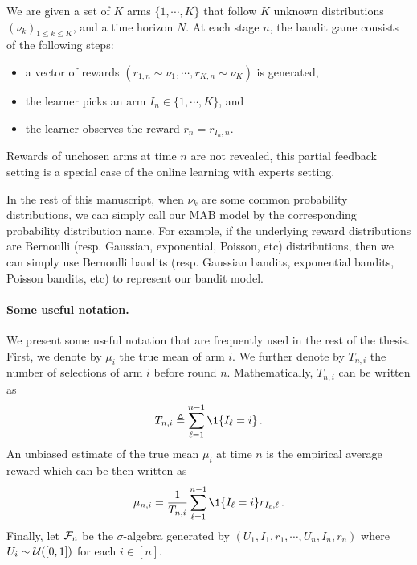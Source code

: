 \begin{definition}\label{def:mab.mab}
\begin{leftbar}[defnbar]
	We are given a set of $K$ arms $\{1,\cdots,K\}$ that follow $K$ unknown distributions $(\nu_k)_{1 \leq k \leq K}$, and a time horizon $N$. At each stage $n$, the bandit game consists of the following steps:
	\begin{itemize}
		\item a vector of rewards $(r_{1,n} \sim \nu_1, \cdots, r_{K,n} \sim \nu_K)$ is generated,
		\item the learner picks an arm $I_n \in \{1,\cdots,K\}$, and
		\item the learner observes the reward $r_n = r_{I_n, n}$.
	\end{itemize}
\end{leftbar}
\end{definition}

\begin{remark}\label{remark:mab.partial}
\begin{leftbar}[remarkbar]
	Rewards of unchosen arms at time $n$ are not revealed, this partial feedback setting is a special case of the online learning with experts setting.
\end{leftbar}
\end{remark}

In the rest of this manuscript, when $\nu_k$ are some common probability distributions, we can simply call our MAB model by the corresponding probability distribution name. For example, if the underlying reward distributions are Bernoulli (resp. Gaussian, exponential, Poisson, etc) distributions, then we can simply use Bernoulli bandits (resp. Gaussian bandits, exponential bandits, Poisson bandits, etc) to represent our bandit model. 

\paragraph{Some useful notation.}
We present some useful notation that are frequently used in the rest of the thesis. First, we denote by $\mu_i$ the true mean of arm $i$. We further denote by $T_{n,i}$ the number of selections of arm $i$ before round $n$. Mathematically, $T_{n,i}$ can be written as
\begin{align}\label{eq:mab.pulls}
    T_{n,i}\eqdef\sum_{\ell=1}^{n-1} \1{\{ I_{\ell} = i \}}\,.
\end{align}
An unbiased estimate of the true mean $\mu_i$ at time $n$ is the empirical average reward which can be then written as
\begin{align}\label{eq:mab.empirical_mean}
    \mu_{n,i}  = \frac{1}{T_{n,i}} \sum_{\ell=1}^{n-1} \1\{I_\ell = i\}r_{I_\ell,\ell}\,.
\end{align}
Finally, let $\mathcal{F}_n$ be the $\sigma$-algebra generated by $(U_1,I_1,r_1,\cdots,U_n,I_n,r_n)$ where $U_i\sim\mathcal{U}([0,1])$ for each $i\in[n]$.


